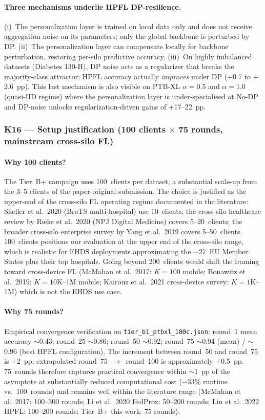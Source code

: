 \documentclass[conference]{IEEEtran}
\begin{document}
\paragraph{Three mechanisms underlie HPFL DP-resilience.} (i)~The personalization layer is trained on local data only and does not receive aggregation noise on its parameters; only the global backbone is perturbed by DP. (ii)~The personalization layer can compensate locally for backbone perturbation, restoring per-silo predictive accuracy. (iii)~On highly imbalanced datasets (Diabetes 130-H), DP noise acts as a regularizer that breaks the majority-class attractor: HPFL accuracy actually \emph{improves} under DP ($+$0.7 to $+$2.6~pp). This last mechanism is also visible on PTB-XL $\alpha{=}0.5$ and $\alpha{=}1.0$ (quasi-IID regime) where the personalization layer is under-specialised at No-DP and DP-noise unlocks regularization-driven gains of $+$17--22~pp.

\subsubsection*{K16 --- Setup justification (100 clients $\times$ 75 rounds, mainstream cross-silo FL)}

\paragraph{Why 100 clients?} The Tier~B+ campaign uses 100~clients per dataset, a substantial scale-up from the 3--5 clients of the paper-original submission. The choice is justified as the upper-end of the cross-silo FL operating regime documented in the literature: Sheller et al.~2020 (BraTS multi-hospital) use 10~clients; the cross-silo healthcare review by Rieke et al.~2020 (NPJ Digital Medicine) covers 5--20~clients; the broader cross-silo enterprise survey by Yang et al.~2019 covers 5--50~clients. 100~clients positions our evaluation at the upper end of the cross-silo range, which is realistic for EHDS deployments approximating the $\sim$27~EU Member States plus their top hospitals. Going beyond 200~clients would shift the framing toward cross-device FL (McMahan et al.~2017: $K{=}100$ mobile; Bonawitz et al.~2019: $K{=}10$K--1M mobile; Kairouz et al.~2021 cross-device survey: $K{=}1$K--1M) which is not the EHDS use case.

\paragraph{Why 75 rounds?} Empirical convergence verification on \texttt{tier\_b1\_ptbxl\_100c.json}: round~1 mean accuracy $\sim$0.43; round~25 $\sim$0.86; round~50 $\sim$0.92; round~75 $\sim$0.94 (mean) / $\sim$0.96 (best HPFL configuration). The increment between round~50 and round~75 is $+$2~pp; extrapolated round~75~$\to$~round~100 is approximately $+$0.5~pp. 75~rounds therefore captures practical convergence within $\sim$1~pp of the asymptote at substantially reduced computational cost ($-$33\% runtime vs.\ 100~rounds) and remains well within the literature range (McMahan et al.~2017: 100--300 rounds; Li et al.~2020 FedProx: 50--200 rounds; Lin et al.~2022 HPFL: 100--200 rounds; Tier~B+ this work: 75 rounds).
\end{document}

